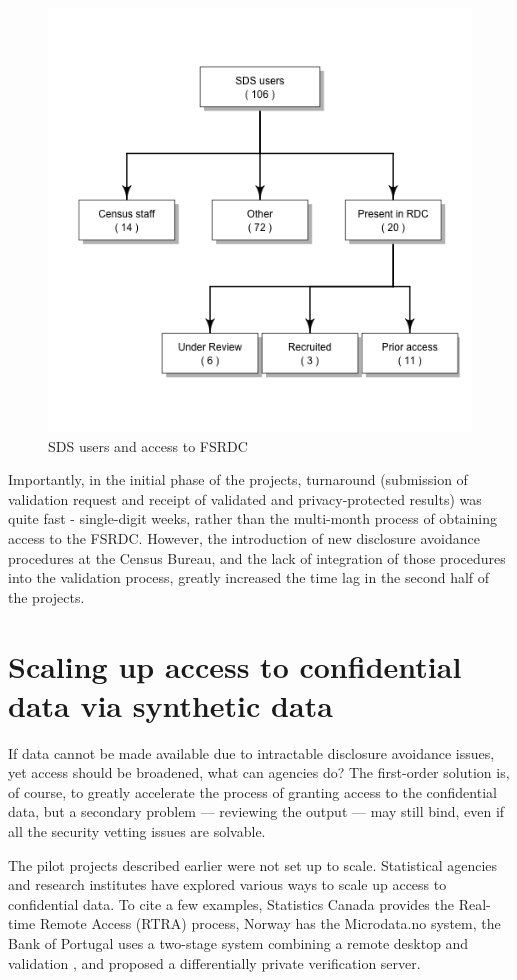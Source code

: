 \documentclass[12pt]{article}
\begin{document}
\begin{figure}
    \centering
    \includegraphics[width=0.5\linewidth]{figs/useRDCgraph.png}
    \caption{SDS users and access to FSRDC}
    \label{fig:useRDC}
\end{figure}

Importantly, in the initial phase of the projects, turnaround (submission of validation request and receipt of validated and privacy-protected results) was quite fast - single-digit weeks, rather than the multi-month process of obtaining access to the \ac{FSRDC}. However, the introduction of new disclosure avoidance procedures at the Census Bureau, and the lack of integration of those procedures into the validation process, greatly increased the time lag in the second half of the projects.

\section{Scaling up access to confidential data via synthetic data}

If data cannot be made available due to intractable disclosure avoidance issues, yet access should be broadened, what can agencies do?  The first-order solution is, of course, to greatly accelerate the process of granting access to the confidential data, but a secondary problem --- reviewing the output  --- may still bind, even if all the security vetting issues are solvable.

The pilot projects described earlier were not set up to scale. Statistical agencies and research institutes have explored various ways to scale up access to confidential data. To cite a few examples, Statistics Canada provides the Real-time Remote Access (RTRA) process, Norway has the Microdata.no system, the Bank of Portugal uses a two-stage system combining a remote desktop and validation \citep{guimaraes_reproducibility_2023}, and \citet{barrientos_providing_2018} proposed a differentially private verification server. 
\end{document}
